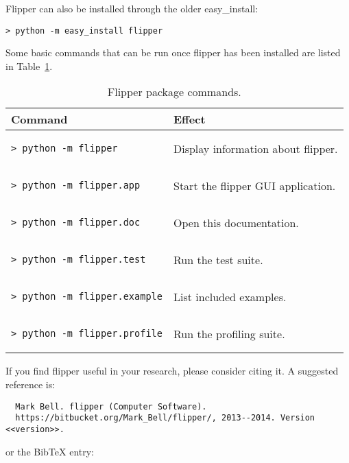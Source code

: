 \documentclass[a4paper]{article}
\begin{document}
Flipper can also be installed through the older easy\_install:
\begin{lstlisting}
> python -m easy_install flipper
\end{lstlisting}

Some basic commands that can be run once flipper has been installed are listed in Table~\ref{tbl:package_commands}.

\begin{table}[ht]
\label{tbl:package_commands}
\begin{center}
\begin{tabular}{l|l}
Command & Effect \\
\hline
\begin{lstlisting}
> python -m flipper
\end{lstlisting} & Display information about flipper. \\

\begin{lstlisting}
> python -m flipper.app
\end{lstlisting} & Start the flipper GUI application. \\

\begin{lstlisting}
> python -m flipper.doc
\end{lstlisting} & Open this documentation. \\

\begin{lstlisting}
> python -m flipper.test
\end{lstlisting} & Run the test suite. \\

\begin{lstlisting}
> python -m flipper.example
\end{lstlisting} & List included examples. \\

\begin{lstlisting}
> python -m flipper.profile
\end{lstlisting} & Run the profiling suite. \\
\end{tabular}
\end{center}
\caption{Flipper package commands.}
\end{table}

If you find flipper useful in your research, please consider citing it. A suggested reference is:
\begin{verbatim}
  Mark Bell. flipper (Computer Software).
  https://bitbucket.org/Mark_Bell/flipper/, 2013--2014. Version <<version>>.
\end{verbatim}
or the BibTeX entry:
\end{document}
